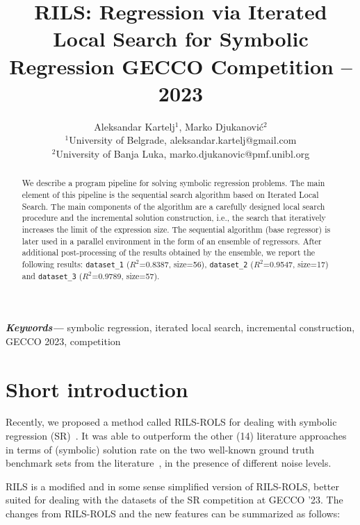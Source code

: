 \documentclass{article}
\title{{RILS}: Regression via Iterated Local Search for Symbolic Regression GECCO Competition -- 2023}
\author{Aleksandar Kartelj$^{1}$, Marko Djukanovi\'{c}$^{2}$  \\
        \small $^{1}$University of Belgrade, aleksandar.kartelj@gmail.com \\
        \small $^{2}$University of Banja Luka, marko.djukanovic@pmf.unibl.org \\
}
\date{}
\providecommand{\keywords}[1]
{
  \small	
  \textbf{\textit{Keywords---}} #1
}
\begin{document}
\maketitle

\begin{abstract} %
We describe a program pipeline for solving symbolic regression problems. The main element of this pipeline is the sequential search algorithm based on Iterated Local Search. The main components of the algorithm are a carefully designed local search procedure and the incremental solution construction, i.e., the search that iteratively increases the limit of the expression size. The sequential algorithm (base regressor) is later used in a parallel environment in the form of an ensemble of regressors.
After additional post-processing of the results obtained by the ensemble, we report the following results: \texttt{dataset\_1} ($R^2$=0.8387, size=56), \texttt{dataset\_2} ($R^2$=0.9547, size=17) and \texttt{dataset\_3} ($R^2$=0.9789, size=57).
\end{abstract}

\keywords{symbolic regression, iterated local search, incremental construction, GECCO 2023, competition}

\section{Short introduction}

Recently, we proposed a method called RILS-ROLS for dealing with symbolic regression (SR)~\cite{kartelj2023_rils_rols}. It was able to outperform the other (14) literature approaches in terms of (symbolic) solution rate on the two well-known ground truth benchmark sets from the literature~\cite{la2021contemporary}, in the presence of different noise levels.

RILS is a modified and in some sense simplified version of RILS-ROLS, better suited for dealing with the datasets of the SR competition at GECCO '23.
The changes from RILS-ROLS and the new features can be summarized as follows:
\end{document}
